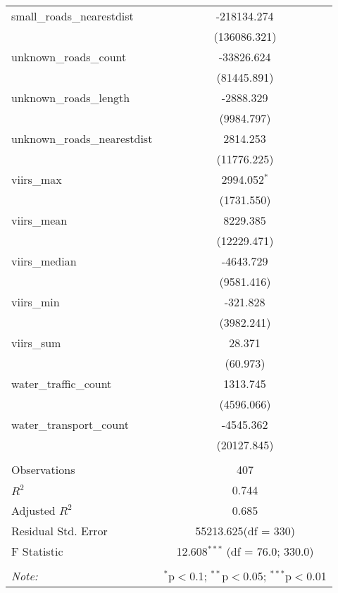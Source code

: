 \begin{table}[!htbp]
\begin{tabular}{@{\extracolsep{5pt}}lc}
 small_roads_nearestdist & -218134.274$^{}$ \\
  & (136086.321) \\
 unknown_roads_count & -33826.624$^{}$ \\
  & (81445.891) \\
 unknown_roads_length & -2888.329$^{}$ \\
  & (9984.797) \\
 unknown_roads_nearestdist & 2814.253$^{}$ \\
  & (11776.225) \\
 viirs_max & 2994.052$^{*}$ \\
  & (1731.550) \\
 viirs_mean & 8229.385$^{}$ \\
  & (12229.471) \\
 viirs_median & -4643.729$^{}$ \\
  & (9581.416) \\
 viirs_min & -321.828$^{}$ \\
  & (3982.241) \\
 viirs_sum & 28.371$^{}$ \\
  & (60.973) \\
 water_traffic_count & 1313.745$^{}$ \\
  & (4596.066) \\
 water_transport_count & -4545.362$^{}$ \\
  & (20127.845) \\
\hline \\[-1.8ex]
 Observations & 407 \\
 $R^2$ & 0.744 \\
 Adjusted $R^2$ & 0.685 \\
 Residual Std. Error & 55213.625(df = 330)  \\
 F Statistic & 12.608$^{***}$ (df = 76.0; 330.0) \\
\hline
\hline \\[-1.8ex]
\textit{Note:} & \multicolumn{1}{r}{$^{*}$p$<$0.1; $^{**}$p$<$0.05; $^{***}$p$<$0.01} \\
\end{tabular}
\end{table}